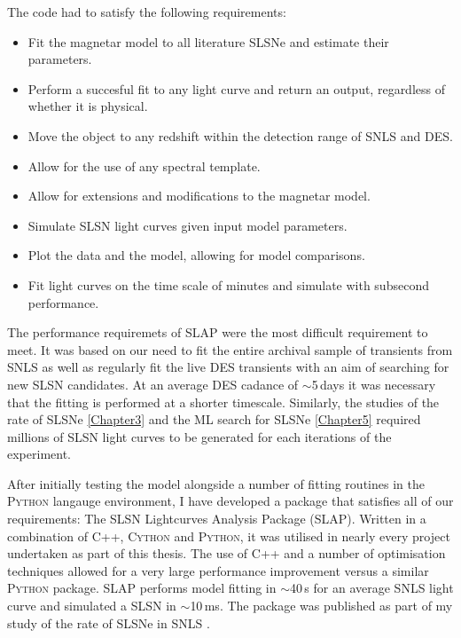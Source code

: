 The code had to satisfy the following requirements:
\begin{itemize}
  \item Fit the magnetar model to all literature SLSNe and estimate their parameters.
  \item Perform a succesful fit to any light curve and return an output, regardless of whether it is physical.
  \item Move the object to any redshift within the detection range of SNLS and DES.
  \item Allow for the use of any spectral template.
  \item Allow for extensions and modifications to the magnetar model.
  \item Simulate SLSN light curves given input model parameters.
  \item Plot the data and the model, allowing for model comparisons.
  \item Fit light curves on the time scale of minutes and simulate with subsecond performance.
\end{itemize}

The performance requiremets of \textsc{SLAP} were the most difficult requirement to meet. It was based on our need to fit the entire archival sample of transients from SNLS as well as regularly fit the live DES transients with an aim of searching for new SLSN candidates. At an average DES cadance of $\sim$5\,days it was necessary that the fitting is performed at a shorter timescale. Similarly, the studies of the rate of SLSNe \cref{Chapter3} and the ML search for SLSNe \cref{Chapter5} required millions of SLSN light curves to be generated for each iterations of the experiment.

After initially testing the model alongside a number of fitting routines in the \textsc{Python} langauge environment, I have developed a package that satisfies all of our requirements: The SLSN Lightcurves Analysis Package (SLAP). Written in a combination of \textsc{C++}, \textsc{Cython} and \textsc{Python}, it was utilised in nearly every project undertaken as part of this thesis. The use of C++ and a number of optimisation techniques allowed for a very large performance improvement versus a similar \textsc{Python} package. \textsc{SLAP} performs model fitting in $\sim$40\,s for an average SNLS light curve and simulated a SLSN in $\sim$10\,ms. The package was published as part of my study of the rate of SLSNe in SNLS \citep{Prajs2016}.

